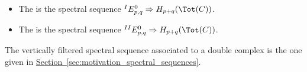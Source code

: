 \documentclass[main.tex]{subfiles}
\begin{document}
\begin{definition}
  \label{def:spectral_sequences_associated_to_a_double_complex}
  \leavevmode
  \begin{itemize}
    \item The  is the spectral sequence $^{I}E^{0}_{p, q} \Rightarrow H_{p+q}(\Tot(C))$.

    \item The  is the spectral sequence $^{II}E^{0}_{p, q} \Rightarrow H_{p+q}(\Tot(C))$.
  \end{itemize}
\end{definition}

The vertically filtered spectral sequence associated to a double complex is the one given in \hyperref[sec:motivation_spectral_sequences]{Section~\ref*{sec:motivation_spectral_sequences}}.
\end{document}
